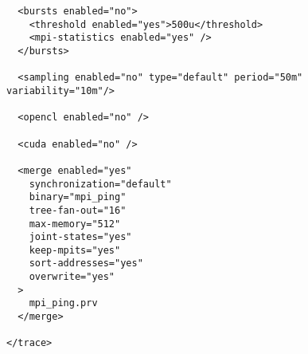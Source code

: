 \begin{verbatim}
  <bursts enabled="no">
    <threshold enabled="yes">500u</threshold>
    <mpi-statistics enabled="yes" />
  </bursts>

  <sampling enabled="no" type="default" period="50m" variability="10m"/>

  <opencl enabled="no" />

  <cuda enabled="no" />

  <merge enabled="yes" 
    synchronization="default"
    binary="mpi_ping"
    tree-fan-out="16"
    max-memory="512"
    joint-states="yes"
    keep-mpits="yes"
    sort-addresses="yes"
    overwrite="yes"
  >
    mpi_ping.prv 
  </merge>

</trace>
\end{verbatim}
